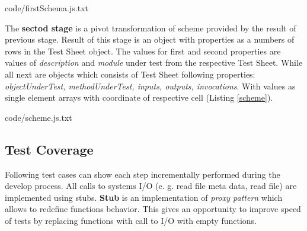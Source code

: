 
{code/firstSchema.js.txt}

The \textbf{sectod stage} is a pivot transformation of scheme provided by the result of previous stage. Result of this stage is an object with properties  as a numbers of rows in the Test Sheet object. The values for first and second properties are values of \textit{description} and \textit{module} under test from the respective Test Sheet. While all next are objects which consists of Test Sheet following properties: \textit{objectUnderTest, methodUnderTest, inputs, outputs, invocations}. With values as single element arrays with coordinate of respective cell (Listing \ref{scheme}).

{code/scheme.js.txt}

%
\subsection{Test Coverage}
Following test cases can show each step incrementally performed during the develop process. All calls to systems I/O (e. g. read file meta data, read file) are implemented using stubs. \textbf{Stub} is an implementation of \textit{proxy pattern} which allows to redefine functions behavior. This gives an opportunity to improve speed of tests by replacing functions with call to I/O with empty functions.
%

